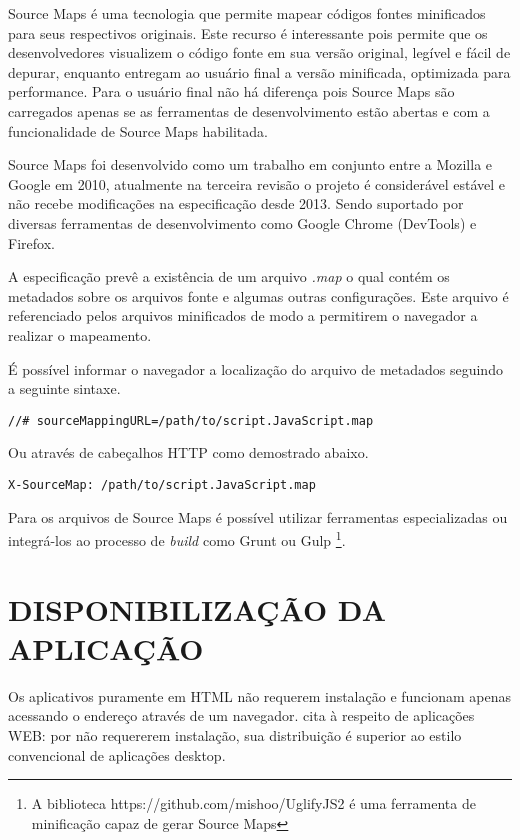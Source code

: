 Source Maps é uma tecnologia que permite mapear códigos fontes
minificados para seus respectivos originais. Este recurso é
interessante pois permite que os desenvolvedores visualizem o código
fonte em sua versão original, legível e fácil de depurar, enquanto
entregam ao usuário final a versão minificada, optimizada para
performance. Para o usuário final não há diferença pois Source Maps
são carregados apenas se as ferramentas de desenvolvimento estão
abertas e com a funcionalidade de Source Maps habilitada.

Source Maps foi desenvolvido como um trabalho em conjunto entre a
Mozilla e Google em 2010, atualmente na terceira revisão o projeto é
considerável estável e não recebe modificações na especificação
desde 2013. Sendo suportado por diversas ferramentas de desenvolvimento
como Google Chrome (DevTools) e Firefox.

A especificação prevê a existência de um arquivo \textit{.map}
o qual contém os metadados sobre os arquivos fonte e algumas outras
configurações. Este arquivo é referenciado pelos arquivos minificados
de modo a permitirem o navegador a realizar o mapeamento.

É possível informar o navegador a localização do arquivo de metadados
seguindo a seguinte sintaxe.

\begin{verbatim}
//# sourceMappingURL=/path/to/script.JavaScript.map
\end{verbatim}

Ou através de cabeçalhos HTTP como demostrado abaixo.

\begin{verbatim}
X-SourceMap: /path/to/script.JavaScript.map
\end{verbatim}

Para os arquivos de Source Maps é possível utilizar ferramentas
especializadas ou integrá-los ao processo de \textit{build} como Grunt ou Gulp
\footnote{A biblioteca https://github.com/mishoo/UglifyJS2 é uma
ferramenta de minificação capaz de gerar Source Maps}.

\section{DISPONIBILIZAÇÃO DA APLICAÇÃO}

Os aplicativos puramente em HTML não requerem instalação e
funcionam apenas acessando o endereço através de um navegador.
\autocite{browserGamesTechnologyAndFuture} cita à respeito de
aplicações WEB: por não requererem instalação, sua distribuição é
superior ao estilo convencional de aplicações desktop.

